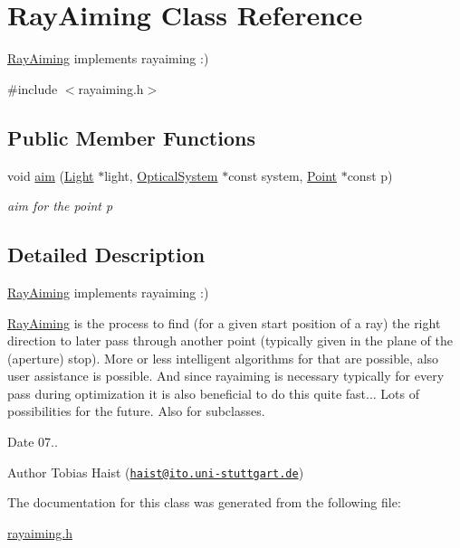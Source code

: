 \hypertarget{classRayAiming}{}\section{Ray\+Aiming Class Reference}
\label{classRayAiming}


\hyperlink{classRayAiming}{Ray\+Aiming} implements rayaiming \+:)  




{\ttfamily \#include $<$rayaiming.\+h$>$}

\subsection*{Public Member Functions}
\begin{DoxyCompactItemize}
\item 
void \hyperlink{classRayAiming_ad1e0cc09137420f09b5f6c49c4cc7b05}{aim} (\hyperlink{classLight}{Light} $\ast$light, \hyperlink{classOpticalSystem}{Optical\+System} $\ast$const system, \hyperlink{classPoint}{Point} $\ast$const p)\hypertarget{classRayAiming_ad1e0cc09137420f09b5f6c49c4cc7b05}{}\label{classRayAiming_ad1e0cc09137420f09b5f6c49c4cc7b05}

\begin{DoxyCompactList}\small\item\em aim for the point p \end{DoxyCompactList}\end{DoxyCompactItemize}


\subsection{Detailed Description}
\hyperlink{classRayAiming}{Ray\+Aiming} implements rayaiming \+:) 

\hyperlink{classRayAiming}{Ray\+Aiming} is the process to find (for a given start position of a ray) the right direction to later pass through another point (typically given in the plane of the (aperture) stop). More or less intelligent algorithms for that are possible, also user assistance is possible. And since rayaiming is necessary typically for every pass during optimization it is also beneficial to do this quite fast... Lots of possibilities for the future. Also for subclasses.

\begin{DoxyDate}{Date}
07.. 
\end{DoxyDate}
\begin{DoxyAuthor}{Author}
Tobias Haist (\href{mailto:haist@ito.uni-stuttgart.de}{\tt haist@ito.\+uni-\/stuttgart.\+de}) 
\end{DoxyAuthor}


The documentation for this class was generated from the following file\+:\begin{DoxyCompactItemize}
\item 
\hyperlink{rayaiming_8h}{rayaiming.\+h}\end{DoxyCompactItemize}
